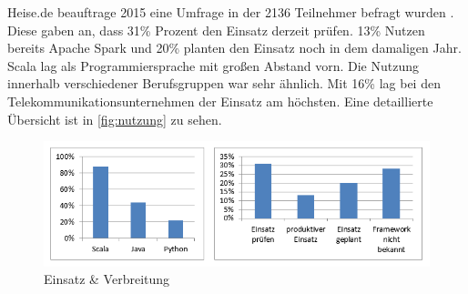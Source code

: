 \noindent
Heise.de beauftrage 2015 eine Umfrage in der 2136 Teilnehmer befragt wurden \cite{HEISEBIGDATA}. Diese gaben an, dass 31\% Prozent den Einsatz derzeit prüfen. 13\% Nutzen bereits Apache Spark und 20\% planten den Einsatz noch in dem damaligen Jahr.
Scala lag als Programmiersprache mit großen Abstand vorn. Die Nutzung innerhalb verschiedener Berufsgruppen war sehr ähnlich. Mit 16\%  lag bei den Telekommunikationsunternehmen der Einsatz am höchsten. Eine detaillierte Übersicht ist in \autoref{fig:nutzung} zu sehen.
\begin{figure}[h]
  \centering
  \includegraphics[width=\textwidth]{./excel/Nutzung.png}
  \caption{Einsatz \& Verbreitung}\label{fig:nutzung}
\end{figure}


